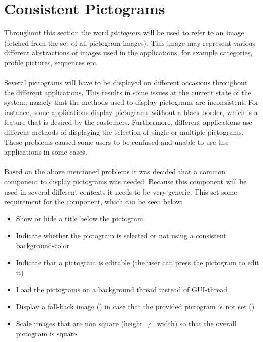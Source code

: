 
\section{Consistent Pictograms}
\label{sec:consistent_pictograms}

Throughout this section the word \textit{pictogram} will be used to refer to an image (fetched from the set of all pictogram-images). This image may represent various different abstractions of images used in the \giraf applications, for example categories, profile pictures, sequences etc.
\\\\
Several pictograms will have to be displayed on different occasions throughout the different \giraf applications. This results in some issues at the current state of the system, namely that the methods used to display pictograms are inconsistent. For instance, some applications display pictograms without a black border, which is a feature that is desired by the customers. Furthermore, different applications use different methods of displaying the selection of single or multiple pictograms. These problems caused some users to be confused and unable to use the applications in some cases. 
\\\\
Based on the above mentioned problems it was decided that a common component to display pictograms was needed. Because this component will be used in several different contexts it needs to be very generic. This set some requirement for the component, which can be seen below:

\begin{itemize}
	\item Show or hide a title below the pictogram
	\item Indicate whether the pictogram is selected or not using a consistent background-color
	\item Indicate that a pictogram is editable (the user can press the pictogram to edit it)
	\item Load the pictograms on a background thread instead of GUI-thread 
	\item Display a fall-back image () in case that the provided pictogram is not set ()
	\item Scale images that are non square (height $\neq$ width) so that the overall pictogram is square
\end{itemize}

